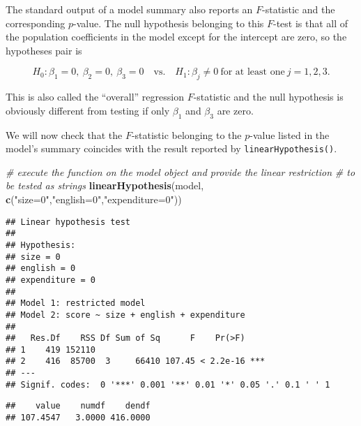 \documentclass[]{book}
\newenvironment{Shaded}{\begin{snugshade}}{\end{snugshade}}
\newcommand{\KeywordTok}[1]{\textcolor[rgb]{0.13,0.29,0.53}{\textbf{#1}}}
\newcommand{\StringTok}[1]{\textcolor[rgb]{0.31,0.60,0.02}{#1}}
\newcommand{\CommentTok}[1]{\textcolor[rgb]{0.56,0.35,0.01}{\textit{#1}}}
\newcommand{\OperatorTok}[1]{\textcolor[rgb]{0.81,0.36,0.00}{\textbf{#1}}}
\newcommand{\NormalTok}[1]{#1}
\theoremstyle{definition}
\theoremstyle{definition}
\theoremstyle{definition}
\theoremstyle{remark}
\begin{document}
The standard output of a model summary also reports an \(F\)-statistic
and the corresponding \(p\)-value. The null hypothesis belonging to this
\(F\)-test is that all of the population coefficients in the model
except for the intercept are zero, so the hypotheses pair is

\[H_0: \beta_1=0, \ \beta_2 =0, \ \beta_3 =0 \quad \text{vs.} \quad H_1: \beta_j \neq 0 \ \text{for at least one} \ j=1,2,3.\]

This is also called the ``overall'' regression \(F\)-statistic and the
null hypothesis is obviously different from testing if only \(\beta_1\)
and \(\beta_3\) are zero.

We will now check that the \(F\)-statistic belonging to the \(p\)-value
listed in the model's summary coincides with the result reported by
\texttt{linearHypothesis()}.

\begin{Shaded}
\begin{Highlighting}[]
\CommentTok{# execute the function on the model object and provide the linear restriction }
\CommentTok{# to be tested as strings}
\KeywordTok{linearHypothesis}\NormalTok{(model, }\KeywordTok{c}\NormalTok{(}\StringTok{"size=0"}\NormalTok{,}\StringTok{"english=0"}\NormalTok{,}\StringTok{"expenditure=0"}\NormalTok{))}
\end{Highlighting}
\end{Shaded}

\begin{verbatim}
## Linear hypothesis test
## 
## Hypothesis:
## size = 0
## english = 0
## expenditure = 0
## 
## Model 1: restricted model
## Model 2: score ~ size + english + expenditure
## 
##   Res.Df    RSS Df Sum of Sq      F    Pr(>F)    
## 1    419 152110                                  
## 2    416  85700  3     66410 107.45 < 2.2e-16 ***
## ---
## Signif. codes:  0 '***' 0.001 '**' 0.01 '*' 0.05 '.' 0.1 ' ' 1
\end{verbatim}

\begin{Shaded}
\end{Shaded}

\begin{verbatim}
##    value    numdf    dendf 
## 107.4547   3.0000 416.0000
\end{verbatim}
\end{document}
